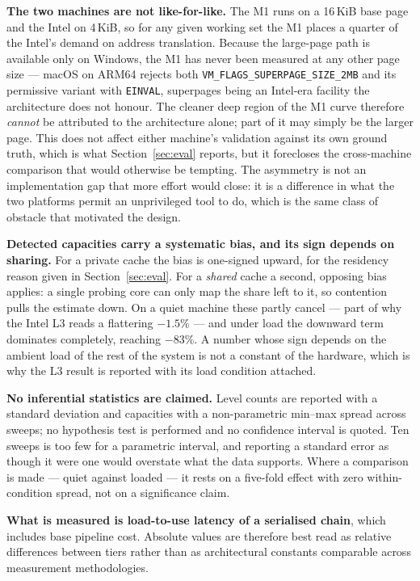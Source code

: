 \documentclass[conference]{IEEEtran}
\begin{document}
\textbf{The two machines are not like-for-like.} The M1 runs on a 16\,KiB base
page and the Intel on 4\,KiB, so for any given working set the M1 places a
quarter of the Intel's demand on address translation. Because the large-page path
is available only on Windows, the M1 has never been measured at any other page
size --- macOS on ARM64 rejects both \texttt{VM\_FLAGS\_SUPERPAGE\_SIZE\_2MB} and
its permissive variant with \texttt{EINVAL}, superpages being an Intel-era
facility the architecture does not honour. The cleaner deep region of the M1
curve therefore \emph{cannot} be attributed to the architecture alone; part of it
may simply be the larger page. This does not affect either machine's validation
against its own ground truth, which is what Section~\ref{sec:eval} reports, but it
forecloses the cross-machine comparison that would otherwise be tempting. The
asymmetry is not an implementation gap that more effort would close: it is a
difference in what the two platforms permit an unprivileged tool to do, which is
the same class of obstacle that motivated the design.

\textbf{Detected capacities carry a systematic bias, and its sign depends on
sharing.} For a private cache the bias is one-signed upward, for the residency
reason given in Section~\ref{sec:eval}. For a \emph{shared} cache a second,
opposing bias applies: a single probing core can only map the share left to it,
so contention pulls the estimate down. On a quiet machine these partly cancel ---
part of why the Intel L3 reads a flattering $-1.5\%$ --- and under load the
downward term dominates completely, reaching $-83\%$. A number whose sign depends
on the ambient load of the rest of the system is not a constant of the hardware,
which is why the L3 result is reported with its load condition attached.

\textbf{No inferential statistics are claimed.} Level counts are reported with a
standard deviation and capacities with a non-parametric min--max spread across
sweeps; no hypothesis test is performed and no confidence interval is quoted. Ten
sweeps is too few for a parametric interval, and reporting a standard error as
though it were one would overstate what the data supports. Where a comparison is
made --- quiet against loaded --- it rests on a five-fold effect with zero
within-condition spread, not on a significance claim.

\textbf{What is measured is load-to-use latency of a serialised chain}, which
includes base pipeline cost. Absolute values are therefore best read as relative
differences between tiers rather than as architectural constants comparable
across measurement methodologies.
\end{document}
